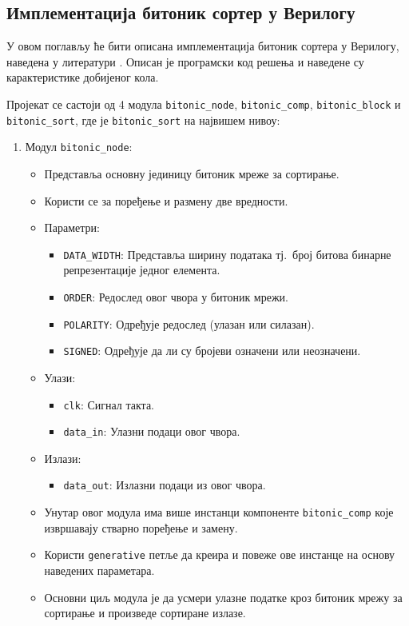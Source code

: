 \documentclass[12pt, a4paper]{article}
\theoremstyle{definition}
\begin{document}
\subsection{Имплементација битоник сортер у Верилогу}

У овом поглављу ће бити описана имплементација битоник сортера у Верилогу, наведена у литератури \cite{git_verilog}. Описан је програмски код решења и наведене су карактеристике добијеног кола.

Пројекат се састоји од 4 модула \verb+bitonic_node+, \verb+bitonic_comp+, \verb+bitonic_block+ и \verb+bitonic_sort+, где је \verb+bitonic_sort+ на највишем нивоу:
\begin{enumerate}
 \item Модул \verb+bitonic_node+:
 \begin{itemize}
  \item Представља основну јединицу битоник мреже за сортирање.
  \item Користи се за поређење и размену две вредности.
  \item Параметри:
  \begin{itemize}
   \item \verb+DATA_WIDTH+: Представља ширину података тј.\ број битова бинарне репрезентације једног елемента.
   \item \verb+ORDER+: Редослед овог чвора у битоник мрежи.
   \item \verb+POLARITY+: Одређује редослед (улазан или силазан).
   \item \verb+SIGNED+: Одређује да ли су бројеви означени или неозначени.
  \end{itemize}
  \item Улази:
  \begin{itemize}
   \item \verb+clk+: Сигнал такта.
   \item \verb+data_in+: Улазни подаци овог чвора.
  \end{itemize}
  \item Излази:
  \begin{itemize}
   \item \verb+data_out+: Излазни подаци из овог чвора.
  \end{itemize}
  \item Унутар овог модула има више инстанци компоненте \verb+bitonic_comp+ које извршавају стварно поређење и замену.
  \item Користи \verb+generative+ петље да креира и повеже ове инстанце на основу наведених параметара.
  \item Основни циљ модула је да усмери улазне податке кроз битоник мрежу за сортирање и произведе сортиране излазе.
 \end{itemize}


\end{enumerate}
\end{document}
